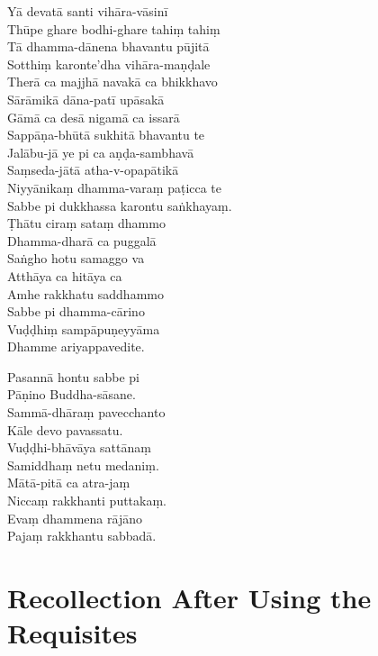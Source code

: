 Yā devatā santi vihāra-vāsinī\\
Thūpe ghare bodhi-ghare tahiṃ tahiṃ\\
Tā dhamma-dānena bhavantu pūjitā\\
Sotthiṃ karonte'dha vihāra-maṇḍale\\
Therā ca majjhā navakā ca bhikkhavo\\
Sārāmikā dāna-patī upāsakā\\
Gāmā ca desā nigamā ca issarā\\
Sappāṇa-bhūtā sukhitā bhavantu te\\
Jalābu-jā ye pi ca aṇḍa-sambhavā\\
Saṃseda-jātā atha-v-opapātikā\\
Niyyānikaṃ dhamma-varaṃ paṭicca te\\
Sabbe pi dukkhassa karontu saṅkhayaṃ.\\
Ṭhātu ciraṃ sataṃ dhammo\\
Dhamma-dharā ca puggalā\\
Saṅgho hotu samaggo va\\
Atthāya ca hitāya ca\\
Amhe rakkhatu saddhammo\\
Sabbe pi dhamma-cārino\\
Vuḍḍhiṃ sampāpuṇeyyāma\\
Dhamme ariyappavedite.

\clearpage

\sidepar{\pointerMark}%
Pasannā hontu sabbe pi\\
Pāṇino Buddha-sāsane.\\
Sammā-dhāraṃ pavecchanto\\
Kāle devo pavassatu.\\
Vuḍḍhi-bhāvāya sattānaṃ\\
Samiddhaṃ netu medaniṃ.\\
Mātā-pitā ca atra-jaṃ\\
Niccaṃ rakkhanti puttakaṃ.\\
Evaṃ dhammena rājāno\\
Pajaṃ rakkhantu sabbadā.


\section{Recollection After Using the Requisites}
\label{recollection-after-using}

\begin{leader}
\end{leader}

